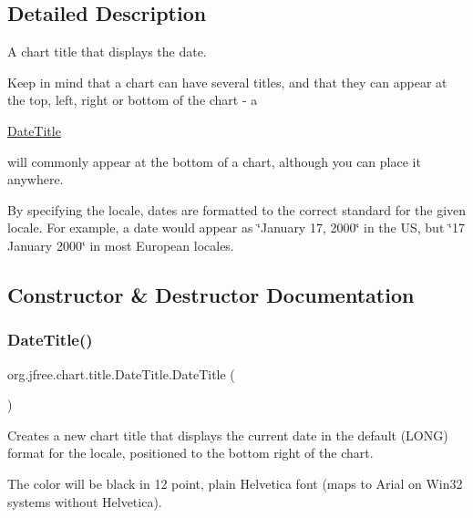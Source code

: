 \subsection{Detailed Description}
A chart title that displays the date. 

Keep in mind that a chart can have several titles, and that they can appear at the top, left, right or bottom of the chart -\/ a
\begin{DoxyCode}
\mbox{\hyperlink{classorg_1_1jfree_1_1chart_1_1title_1_1_date_title_a061f618ba94f5fc912a1d666d745de5b}{DateTitle}} 
\end{DoxyCode}
 will commonly appear at the bottom of a chart, although you can place it anywhere. 

By specifying the locale, dates are formatted to the correct standard for the given locale. For example, a date would appear as \char`\"{}\+January 17, 2000\char`\"{} in the US, but \char`\"{}17 January 2000\char`\"{} in most European locales. 

\subsection{Constructor \& Destructor Documentation}
\mbox{\label{classorg_1_1jfree_1_1chart_1_1title_1_1_date_title_a061f618ba94f5fc912a1d666d745de5b}} 
\subsubsection{\texorpdfstring{Date\+Title()}{DateTitle()}\hspace{0.1cm}{\footnotesize\ttfamily [1/4]}}
{\footnotesize\ttfamily org.\+jfree.\+chart.\+title.\+Date\+Title.\+Date\+Title (\begin{DoxyParamCaption}{ }\end{DoxyParamCaption})}

Creates a new chart title that displays the current date in the default (L\+O\+NG) format for the locale, positioned to the bottom right of the chart. 

The color will be black in 12 point, plain Helvetica font (maps to Arial on Win32 systems without Helvetica). \mbox{\label{classorg_1_1jfree_1_1chart_1_1title_1_1_date_title_a27c04018a19f116822c98019e380b6b0}} 
